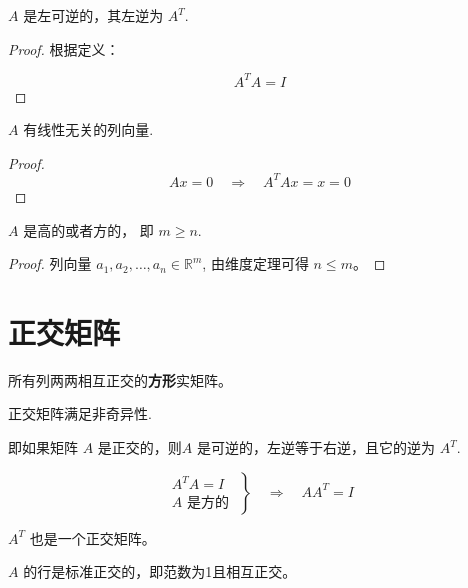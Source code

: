 \begin{theorem}
    $ A $ 是左可逆的，其左逆为 $ A^{T} $.
\end{theorem}

\begin{proof}
    根据定义：

$$
A^{T} A=I
$$
\end{proof}

\begin{theorem}
    $ A $ 有线性无关的列向量.
\end{theorem}

\begin{proof}
    $$
A x=0 \quad \Rightarrow \quad A^{T} A x=x=0
$$
\end{proof}

\begin{theorem}
    $A$ 是高的或者方的， 即 $m \geq n$.
\end{theorem}

\begin{proof}
    列向量 $ a_{1}, a_{2}, \ldots, a_{n} \in \mathbb{R}^{m} $, 由维度定理可得 $ n \leq m $。
\end{proof}

\section{正交矩阵}

\begin{definition}[正交矩阵]
    所有列两两相互正交的\textbf{方形}实矩阵。
\end{definition}

\begin{theorem}
    正交矩阵满足非奇异性.
    
    即如果矩阵 $ A $ 是正交的，则$ A $ 是可逆的，左逆等于右逆，且它的逆为 $ A^{T} $.

    $$ \left.\begin{array}{l}A^{T} A=I \\ A \text { 是方的 }\end{array}\right\} \quad \Rightarrow \quad A A^{T}=I $$
\end{theorem}

\begin{corollary}
    $ A^{T} $ 也是一个正交矩阵。
\end{corollary}

\begin{corollary}
    $ A $ 的行是标准正交的，即范数为1且相互正交。
\end{corollary}

